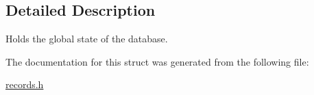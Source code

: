 \subsection{Detailed Description}
Holds the global state of the database. 

The documentation for this struct was generated from the following file\+:\begin{DoxyCompactItemize}
\item 
\mbox{\hyperlink{records_8h}{records.\+h}}\end{DoxyCompactItemize}
